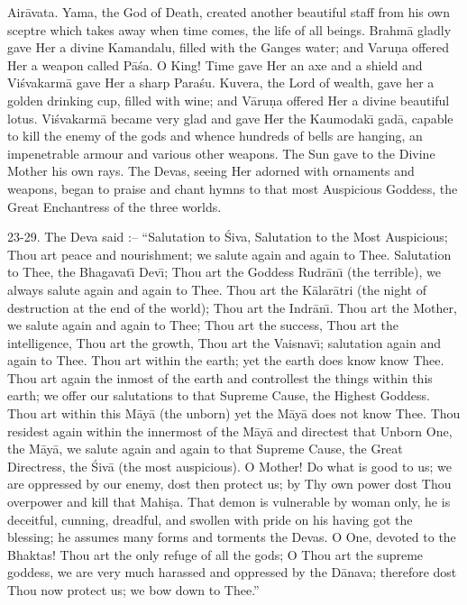 Air\=avata. Yama, the God of Death, created another beautiful staff from his own sceptre which takes away when time comes, the life of all beings. Brahm\=a gladly gave Her a divine Kamandalu, filled with the Ganges water; and Varu\d{n}a offered Her a weapon called P\=a\'sa. O King! Time gave Her an axe and a shield and Vi\'svakarm\=a gave Her a sharp Para\'su. Kuvera, the Lord of wealth, gave her a golden drinking cup, filled with wine; and V\=aru\d{n}a offered Her a divine beautiful lotus. Vi\'svakarm\=a became very glad and gave Her the Kaumodak\={\i} gad\=a, capable to kill the enemy of the gods and whence hundreds of bells are hanging, an impenetrable armour and various other weapons. The Sun gave to the Divine Mother his own rays. The Devas, seeing Her adorned with ornaments and weapons, began to praise and chant hymns to that most Auspicious Goddess, the Great Enchantress of the three worlds.

23-29. The Deva said :-- ``Salutation to \'Siva, Salutation to the Most Auspicious; Thou art peace and nourishment; we salute again and again to Thee. Salutation to Thee, the Bhagavat\={\i} Dev\={\i}; Thou art the Goddess Rudr\=an\={\i} (the terrible), we always salute again and again to Thee. Thou art the K\=alar\=atri (the night of destruction at the end of the world); Thou art the Indr\=an\={\i}. Thou art the Mother, we salute again and again to Thee; Thou art the success, Thou art the intelligence, Thou art the growth, Thou art the Vaisnav\={\i}; salutation again and again to Thee. Thou art within the earth; yet the earth does know know Thee. Thou art again the inmost of the earth and controllest the things within this earth; we offer our salutations to that Supreme Cause, the Highest Goddess. Thou art within this M\=ay\=a (the unborn) yet the M\=ay\=a does not know Thee. Thou residest again within the innermost of the M\=ay\=a and directest that Unborn One, the M\=ay\=a, we salute again and again to that Supreme Cause, the Great Directress, the \'Siv\=a (the most auspicious). O Mother! Do what is good to us; we are oppressed by our enemy, dost then protect us; by Thy own power dost Thou overpower and kill that Mahi\d{s}a. That demon is vulnerable by woman only, he is deceitful, cunning, dreadful, and swollen with pride on his having got the blessing; he assumes many forms and torments the Devas. O One, devoted to the Bhaktas! Thou art the only refuge of all the gods; O Thou art the supreme goddess, we are very much harassed and oppressed by the D\=anava; therefore dost Thou now protect us; we bow down to Thee.''

